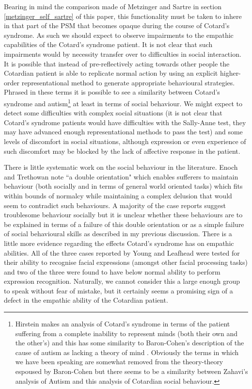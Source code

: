 Bearing in mind the comparison made of Metzinger and Sartre in section \ref{metzinger_self_sartre} of this paper, this functionality must be taken to inhere in that part of the PSM that becomes opaque during the course of Cotard's syndrome. As such we should expect to observe impairments to the empathic capabilities of the Cotard's syndrome patient. It is not clear that such impairments would by necessity transfer over to difficulties in social interaction. It is possible that instead of pre-reflectively acting towards other people the Cotardian patient is able to replicate normal action by
using an explicit higher-order representational method to generate appropriate behavioural strategies. Phrased in these terms it is possible to see a similarity between Cotard's syndrome and autism\footnote{Hirstein makes an analysis of Cotard's syndrome in terms of the patient suffering from a complete inability to represent minds (both their own and the other's) \cite[p. 127]{hirstein2005} and this has some similarity to Baron-Cohen's description of the cause of autism as lacking a theory of mind \cite{baron1985autistic}. Obviously the terms in which we have been speaking are somewhat removed from the theory-theory espoused by Baron-Cohen but there seems to be a similarity between Zahavi's \cite[P. 218]{zahavi2005} analysis of Autism and this analysis of Cotardian social behaviour.} at least in terms of social behaviour. We might expect to detect some difficulties with complex social situations (it is not clear that Cotard's syndrome patients would have difficulties with the Sally-Anne test, they may have advanced enough representational methods to pass the test) and some levels of discomfort in social situations, although expression or even experience of such discomfort may be blocked by the lack of affective response in the patient.

There is little systematic work on the social behaviour in the literature. Enoch and Trethowan note ``a double orientation" \cite[p. 159]{enoch1991} which enables sufferers to maintain behaviour (both socially and in terms of general world oriented tasks) which fits within bounds of normalcy while maintaining a complex delusion that would seem to contradict such behaviours. A majority of the case reports suggest troublesome behaviour socially but it is unclear whether these behaviours are to be explained in terms of a failure of this double orientation or as a simple failure of social behavioural skills as described in my previous discussion. There is a little more evidence regarding the effects Cotard's syndrome has on empathic abilities. All of the three cases reported by Young and Leafhead were tested for their ability to recognise facial expressions (amongst other facial processing tasks) and two of the three were found to have below normal ability to perform expression recognition. Naturally, we cannot consider this a large enough group to speak without fear of mistake, but it certainly seems a promising sign of a defect in the empathic ability of the Cotardian patient.


